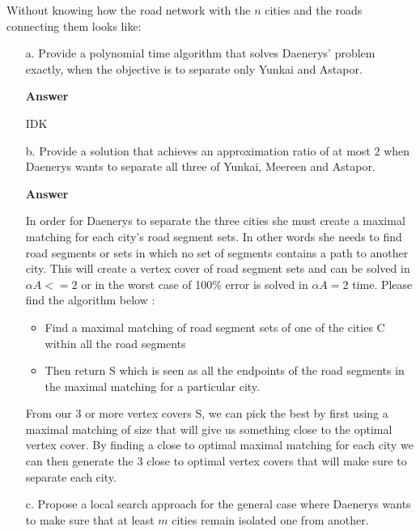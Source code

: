 \documentclass{article}
\begin{document}
\noindent Without knowing how the road network with the $n$ cities and
the roads connecting them looks like:

\begin{itemize}
\item[a.] Provide a polynomial time algorithm that solves Daenerys'
  problem exactly, when the objective is to separate only Yunkai and
  Astapor.

\textbf{ Answer }
\vspace{0.1in}
\begin{adjustwidth}{1.8em}{0pt}
IDK
\end{adjustwidth}
\vspace{0.1in}

\item[b.] Provide a solution that achieves an approximation ratio of
  at most 2 when Daenerys wants to separate all three of Yunkai,
  Meereen and Astapor.

\textbf{ Answer }
\vspace{0.1in}
\begin{adjustwidth}{1.8em}{0pt}
In order for Daenerys to separate the three cities she must create a maximal matching for each city's road segment sets. In other words she needs to find road segments or sets in which no set of segments contains a path to another city. This will create a vertex cover of road segment sets and can be solved in $\alpha A <= 2$ or in the worst case of 100\% error is solved in $\alpha A = 2$ time. Please find the algorithm below : 
\begin{itemize}
\item Find a maximal matching of road segment sets of one of the cities C within all the road segments
\item Then return S which is seen as all the endpoints of the road segments in the maximal matching for a particular city.
\end{itemize}
From our 3 or more vertex covers S, we can pick the best by first using a maximal matching of size that will give us something close to the optimal vertex cover. By finding a close to optimal maximal matching for each city we can then generate the 3 close to optimal vertex covers that will make sure to separate each city.
\end{adjustwidth}
\vspace{0.1in}
  
\item[c.] Propose a local search approach for the general case where
  Daenerys wants to make sure that at least $m$ cities remain isolated
  one from another.


\end{itemize}
\end{document}
